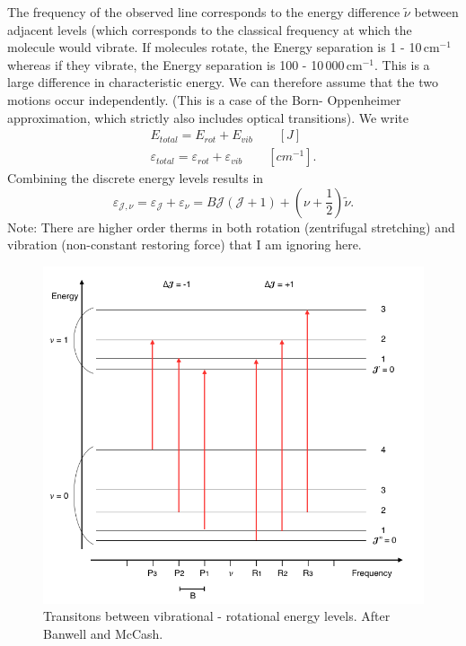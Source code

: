 \documentclass[a4paper,fleqn]{article}
\renewcommand{\epsilon}{\varepsilon}  %
\begin{document}
The frequency of the observed line corresponds to the energy difference $\tilde{\nu}$ between adjacent levels (which corresponds to the classical frequency at which the molecule would vibrate. If molecules rotate, the Energy separation is 1 - 10\,cm$^{-1}$ whereas if they vibrate, the Energy separation is 100 - 10\,000\,cm$^{-1}$. This is a large difference in characteristic energy. We can therefore assume that the two motions occur independently.
 (This is a case of the Born- Oppenheimer approximation, which strictly also includes optical transitions). We write
 \begin{gather}
E_{total} = E_{rot} + E_{vib} \qquad \left[J\right]  \\
\epsilon_{total} = \epsilon_{rot} + \epsilon_{vib} \qquad \left[cm^{-1}\right].
 \end{gather}
Combining the discrete energy levels results in
\begin{equation}
\epsilon_{\mathcal{J},\nu} = \epsilon_{\mathcal{J}} + \epsilon_{\nu} = B \mathcal{J} (\mathcal{J} + 1) + (\nu + \frac{1}{2})\tilde{\nu}.
\end{equation}
Note: There are higher order therms in both rotation (zentrifugal stretching) and vibration (non-constant restoring force) that I am ignoring here. \par
 
 \begin{figure}[htbp]
\begin{center}
\includegraphics[width=1\textwidth]{figures/Transitions_vib_rot}
\caption{Transitons between vibrational - rotational energy levels. After Banwell and McCash.}
\label{Transitions_vib_rot}
\end{center}
\end{figure}
 
\end{document}
